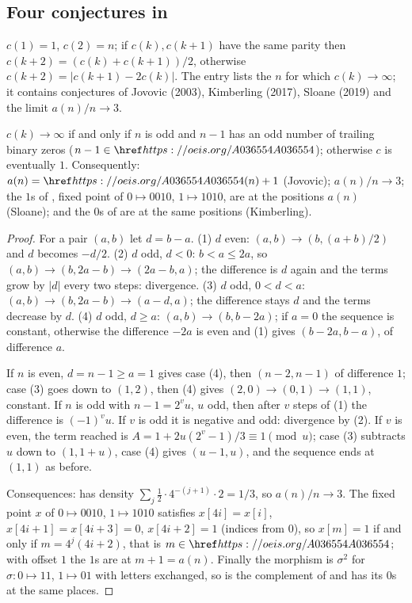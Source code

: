 \subsection{Four conjectures in }\label{s:A072939}
$c(1)=1$, $c(2)=n$; if $c(k),c(k+1)$ have the same parity then $c(k+2)=(c(k)+c(k+1))/2$, otherwise
$c(k+2)=|c(k+1)-2c(k)|$. The entry lists the $n$ for which $c(k)\to\infty$; it contains conjectures of Jovovic
(2003), Kimberling (2017), Sloane (2019) and the limit $a(n)/n\to3$.
\begin{theorem} $c(k)\to\infty$ if and only if $n$ is odd and $n-1$ has an odd number of trailing binary zeros
($n-1\in\oeis{A036554}$); otherwise $c$ is eventually $1$. Consequently: $a(n)=\oeis{A036554}(n)+1$ (Jovovic);
$a(n)/n\to3$; the $1$s of , fixed point of $0\mapsto0010$, $1\mapsto1010$, are at the positions
$a(n)$ (Sloane); and the $0$s of  are at the same positions (Kimberling).\end{theorem}
\begin{proof} For a pair $(a,b)$ let $d=b-a$. (1) $d$ even: $(a,b)\to(b,(a+b)/2)$ and $d$ becomes $-d/2$.
(2) $d$ odd, $d<0$: $b<a\le2a$, so $(a,b)\to(b,2a-b)\to(2a-b,a)$; the difference is $d$ again and the terms grow
by $|d|$ every two steps: divergence. (3) $d$ odd, $0<d<a$: $(a,b)\to(b,2a-b)\to(a-d,a)$; the difference stays $d$
and the terms decrease by $d$. (4) $d$ odd, $d\ge a$: $(a,b)\to(b,b-2a)$; if $a=0$ the sequence is constant,
otherwise the difference $-2a$ is even and (1) gives $(b-2a,b-a)$, of difference $a$.

If $n$ is even, $d=n-1\ge a=1$ gives case (4), then $(n-2,n-1)$ of difference $1$; case (3) goes down to $(1,2)$,
then (4) gives $(2,0)\to(0,1)\to(1,1)$, constant. If $n$ is odd with $n-1=2^vu$, $u$ odd, then after $v$ steps of (1)
the difference is $(-1)^vu$. If $v$ is odd it is negative and odd: divergence by (2). If $v$ is even, the term
reached is $A=1+2u(2^v-1)/3\equiv1\pmod u$; case (3) subtracts $u$ down to $(1,1+u)$, case (4) gives $(u-1,u)$, and
the sequence ends at $(1,1)$ as before.

Consequences:  has density $\sum_j\tfrac12\cdot4^{-(j+1)}\cdot2=1/3$, so $a(n)/n\to3$. The fixed
point $x$ of $0\mapsto0010$, $1\mapsto1010$ satisfies $x[4i]=x[i]$, $x[4i+1]=x[4i+3]=0$, $x[4i+2]=1$ (indices from
$0$), so $x[m]=1$ if and only if $m=4^j(4i+2)$, that is $m\in\oeis{A036554}$; with offset $1$ the $1$s are at
$m+1=a(n)$. Finally the morphism is $\sigma^2$ for $\sigma:0\mapsto11$, $1\mapsto01$ with letters exchanged, so
 is the complement of  and has its $0$s at the same places. \end{proof}

